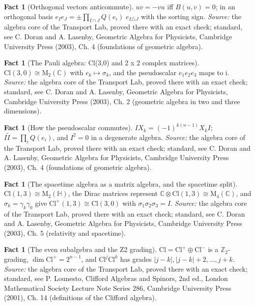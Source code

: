 \documentclass[11pt]{article}
\theoremstyle{definition}
\newtheorem{fact}[theorem]{Fact}
\theoremstyle{plain}
\providecommand{\C}{}\renewcommand{\C}{\mathbb{C}}
\providecommand{\Cl}{}\renewcommand{\Cl}{\mathrm{Cl}}
\providecommand{\HH}{}\renewcommand{\HH}{\mathbb{H}}
\providecommand{\Mat}{}\renewcommand{\Mat}{\mathrm{M}}
\begin{document}
\begin{fact}[Orthogonal vectors anticommute]\label{c:std-algebra.orthogonal-anticommute}
$uv = -vu$ iff $B(u,v) = 0$; in an orthogonal basis $e_I e_J = \pm \prod_{I \cap J} Q(e_i)\; e_{I \triangle J}$ with the sorting sign.
\emph{Source:} the algebra core of the Transport Lab, proved there with an exact check; standard, see C. Doran and A. Lasenby, Geometric Algebra for Physicists, Cambridge University Press (2003), Ch. 4 (foundations of geometric algebra).
\end{fact}

\begin{fact}[The Pauli algebra: Cl(3,0) and 2 x 2 complex matrices]\label{c:std-algebra.pauli-algebra}
$\Cl(3,0) \cong \Mat_2(\C)$ with $e_k \mapsto \sigma_k$, and the pseudoscalar $e_1e_2e_3$ maps to $\mathrm{i}$.
\emph{Source:} the algebra core of the Transport Lab, proved there with an exact check; standard, see C. Doran and A. Lasenby, Geometric Algebra for Physicists, Cambridge University Press (2003), Ch. 2 (geometric algebra in two and three dimensions).
\end{fact}

\begin{fact}[How the pseudoscalar commutes]\label{c:std-algebra.pseudoscalar-commutation}
$I X_k = (-1)^{k(n-1)} X_k I$; $I\tilde{I} = \prod_i Q(e_i)$, and $I^{2} = 0$ in a degenerate algebra.
\emph{Source:} the algebra core of the Transport Lab, proved there with an exact check; standard, see C. Doran and A. Lasenby, Geometric Algebra for Physicists, Cambridge University Press (2003), Ch. 4 (foundations of geometric algebra).
\end{fact}

\begin{fact}[The spacetime algebra as a matrix algebra, and the spacetime split]\label{c:std-algebra.sta-matrix}
$\Cl(1,3) \cong \Mat_2(\HH)$, the Dirac matrices represent $\C \otimes \Cl(1,3) \cong \Mat_4(\C)$, and $\sigma_k = \gamma_k\gamma_0$ give $\Cl^{+}(1,3) \cong \Cl(3,0)$ with $\sigma_1\sigma_2\sigma_3 = I$.
\emph{Source:} the algebra core of the Transport Lab, proved there with an exact check; standard, see C. Doran and A. Lasenby, Geometric Algebra for Physicists, Cambridge University Press (2003), Ch. 5 (relativity and spacetime).
\end{fact}

\begin{fact}[The even subalgebra and the Z2 grading]\label{c:std-algebra.z2-grading}
$\Cl = \Cl^{+} \oplus \Cl^{-}$ is a $\mathbb{Z}_2$-grading, $\dim \Cl^{+} = 2^{n-1}$, and $\Cl^{j}\Cl^{k}$ has grades $|j-k|, |j-k|+2, \dots, j+k$.
\emph{Source:} the algebra core of the Transport Lab, proved there with an exact check; standard, see P. Lounesto, Clifford Algebras and Spinors, 2nd ed., London Mathematical Society Lecture Note Series 286, Cambridge University Press (2001), Ch. 14 (definitions of the Clifford algebra).
\end{fact}
\end{document}
